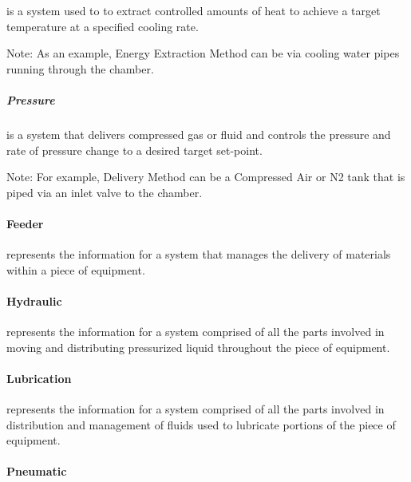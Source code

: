  is a system used to to extract controlled amounts of heat to achieve a target temperature at a specified cooling rate.

Note: As an example, Energy Extraction Method can be via cooling water pipes running through the chamber.



\subparagraph{Pressure}\mbox{}
\label{sec:Pressure}


 is a system that delivers compressed gas or fluid and controls the pressure and rate of pressure change to a desired target set-point.

Note: For example, Delivery Method can be a Compressed Air or N2 tank that is piped via an inlet valve to the chamber.



\paragraph{Feeder}\mbox{}
\label{sec:Feeder}


 represents the information for a system that manages the delivery of materials within a piece of equipment.



\paragraph{Hydraulic}\mbox{}
\label{sec:Hydraulic}


 represents the information for a system comprised of all the parts involved in moving and distributing pressurized liquid throughout the piece of equipment.



\paragraph{Lubrication}\mbox{}
\label{sec:Lubrication}


 represents the information for a system comprised of all the parts involved in distribution and management of fluids used to lubricate portions of the piece of equipment.



\paragraph{Pneumatic}\mbox{}
\label{sec:Pneumatic}


